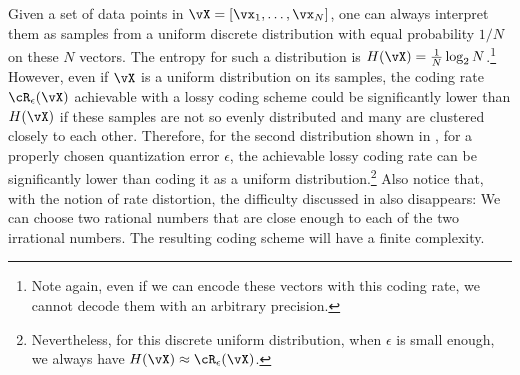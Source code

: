 \documentclass[../../book-main.tex]{subfiles}
\begin{document}
\begin{remark}
    Given a set of data points in $\vX = [\vx_1,\ldots, \vx_N]$, one can always
    interpret them as samples from a uniform discrete distribution with equal
    probability $1/N$ on these $N$ vectors. The entropy for such a distribution
    is $H(\vX) = \frac{1}{N}\log_2 N$.\footnote{Note again, even if
        we can encode
        these vectors with this coding rate, we cannot decode them
        with an arbitrary
    precision.} However, even if $\vX$ is  a uniform distribution on
    its samples,
    the coding rate $\cR_{\epsilon}(\vX)$ achievable with a lossy coding scheme
    could be significantly lower than $H(\vX)$ if these samples are
    not so evenly
    distributed and many are clustered closely to each other. Therefore, for the
    second distribution shown in , for a properly chosen
    quantization error  $\epsilon$, the achievable lossy coding rate can be
    significantly lower than coding it as a uniform
    distribution.\footnote{Nevertheless, for this discrete uniform distribution,
        when $\epsilon$ is small enough, we always have $H(\vX) \approx
    \cR_{\epsilon}(\vX)$.} Also notice that, with the notion of rate
    distortion, the difficulty discussed in
     also disappears: We can choose two
    rational numbers that are close enough to each of the two
    irrational numbers. The resulting coding scheme will have a
    finite complexity.
\end{remark}
\end{document}
